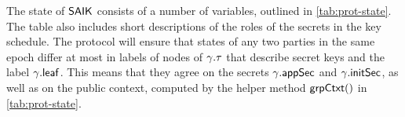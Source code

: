 
The state of ${\normalfont\textsf{SAIK}}$ consists of a number of variables, outlined in \cref{tab:prot-state}. The table also includes short
descriptions of the roles of the secrets in the key schedule. The protocol will ensure that states of any two parties in
the same epoch differ at most in labels of nodes of $\gamma.\tau$ that describe secret keys and the label
$\gamma.{\mathsf{leaf}}$. This means that they agree on the secrets $\gamma.{\mathsf{appSec}}$ and $\gamma.{\mathsf{initSec}}$, as well
as on the public context, computed by the helper method ${\mathsf{grpCtxt}}()$ in \cref{tab:prot-state}.



